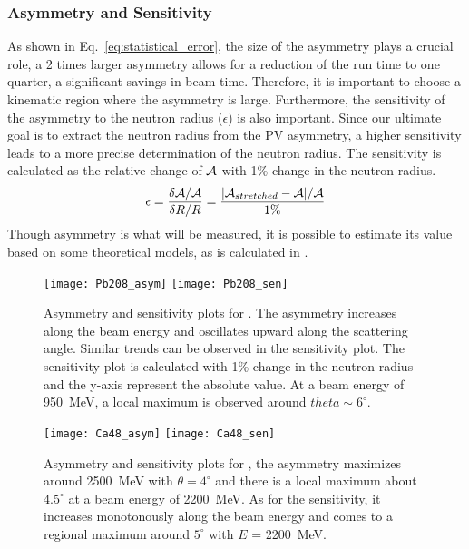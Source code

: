 \subsubsection{Asymmetry and Sensitivity}
As shown in Eq.~\ref{eq:statistical_error}, the size of the asymmetry plays a crucial role,
a 2 times larger asymmetry allows for a reduction of the run time to one quarter,
a significant savings in beam time. Therefore, it is important to choose a kinematic region where
the asymmetry is large. Furthermore, the sensitivity of the asymmetry to the neutron radius ($\epsilon$) 
is also important. Since our ultimate goal is to extract the neutron radius
from the PV asymmetry, a higher sensitivity leads to a more precise determination
of the neutron radius. The sensitivity is calculated
as the relative change of $\mathcal{A}$ with 1\% change in the neutron radius.
\begin{equation}
    \epsilon = \frac{\delta \mathcal{A}/\mathcal{A}}{\delta R/R} = \frac{|\mathcal{A}_{stretched} - \mathcal{A}|/\mathcal{A}}{1\%}
\end{equation}
Though asymmetry is what will be measured, it is possible to estimate its value based
on some theoretical models, as is calculated in \cite{PhysRevC.57.3430}.
\begin{figure}[!h]
    \texttt{[image: Pb208\_asym]}
    \texttt{[image: Pb208\_sen]}
    \caption[Asymmetry and sensitivity for \Pb]
    {Asymmetry and sensitivity plots for \Pb. The asymmetry increases along 
    the beam energy and oscillates upward along the scattering angle. 
    Similar trends can be observed in the sensitivity plot.
    The sensitivity plot is calculated with 1\% change in the neutron radius and the y-axis
    represent the absolute value.
    At a beam energy of 950~MeV, a local maximum is observed around $theta \sim 6^\circ$.
    }
\end{figure}
\begin{figure}[!h]
    \texttt{[image: Ca48\_asym]}
    \texttt{[image: Ca48\_sen]}
    \caption[Asymmetry and sensitivity for \Ca]
    {Asymmetry and sensitivity plots for \Ca, the asymmetry maximizes
    around 2500~MeV with $\theta = 4^\circ$ and there is a local maximum 
    about $4.5^\circ$ at a beam energy of 2200~MeV. As for the sensitivity, it increases
    monotonously along the beam energy and comes to a regional maximum around $5^\circ$
    with $E$ = 2200~MeV.
    }
    \label{fig:ca48_asym_sen}
\end{figure}

